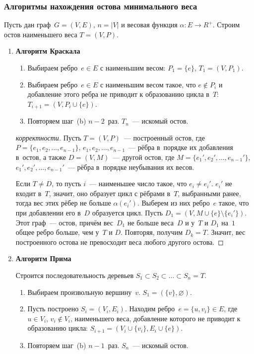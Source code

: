 \subsubsection{Алгоритмы нахождения остова минимального веса}
Пусть дан граф~$G = (V, E)$, $n = |V|$ и весовая функция $\alpha \colon E \to R^+$.
Строим остов наименьшего веса $T = (V, P)$.
\begin{enumerate}
	\item{}\textbf{Алгоритм Краскала}
	\begin{enumerate}
		\item Выбираем ребро~$e \in E$ с наименьшим весом: $P_1 = \{ e \}$, $T_1 = (V, P_1)$.
		\item Выбираем ребро~$e \in E$ с наименьшим весом такое, что $e \notin P_i$ и добавление этого ребра не приводит к образованию цикла в~$T$: $T_{i+1} = (V, P_i \cup \{ e \})$.
		\item Повторяем шаг~(b) $n - 2$~раз.
		$T_n$~--- искомый остов.
	\end{enumerate}
	\begin{proof}[корректности]
		Пусть $T = (V, P)$~--- построенный остов, где
		$P = \{ e_1, e_2, \ldots, e_{n-1} \}$, $e_1, e_2, \ldots, \allowbreak e_{n-1}$~--- рёбра в~порядке их добавления в~остов, а также $D = (V, M)$~--- другой остов, где
		$M = \{ e_1', e_2', \ldots, e_{n-1}' \}$, $e_1', e_2', \ldots, e_{n-1}'$~--- рёбра в~порядке неубывания их весов.
		
		Если $T \neq D$, то пусть $i$~--- наименьшее число такое, что $e_i \neq e_i'$.
		$e_i'$ не входит в~$T$, значит, оно образует цикл с рёбрами в~$T$, выбранными ранее, тогда вес этих рёбер не больше $\alpha(e_i')$.
		Выберем из них ребро~$e$ такое, что при добавлении его в~$D$ образуется цикл.
		Пусть $D_1 = (V, M \cup \{ e \} \setminus \{ e_i' \})$.
		Этот граф~--- остов, причём вес~$D_1$ не больше веса~$D$ и у~$T$ и $D_1$ на~$1$ общее ребро больше, чем у~$T$ и $D$.
		Повторяя, получим $D_k = T$.
		Значит, вес построенного остова не превосходит веса любого другого остова.
	\end{proof}

	\item{}\textbf{Алгоритм Прима}
	
	Строится последовательность деревьев $S_1 \subset S_2 \subset \ldots \subset S_n = T$.
	\begin{enumerate}
		\item Выбираем произвольную вершину~$v$.
		$S_1 = (\{ v \}, \varnothing)$.
		\item Пусть построено $S_i = (V_i, E_i)$.
		Находим ребро~$e = \{ u, v_i \} \in E$, где $u \in V_i$, $v_i \notin V_i$, наименьшего веса, добавление которого не приводит к образованию цикла: $S_{i+1} = (V_i \cup \{ v_i \}, E_i \cup \{ e \})$.
		\item Повторяем шаг~(b) $n - 1$~раз.
		$S_n$~--- искомый остов.
	\end{enumerate}
\end{enumerate}